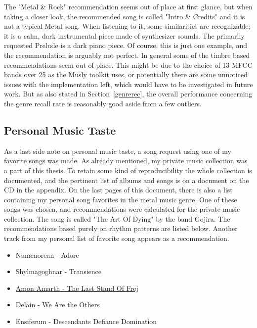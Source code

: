 \noindent The "Metal \& Rock" recommendation seems out of place at first glance, but when taking a closer look, the recommended song is called "Intro \& Credits" and it is not a typical Metal song. When listening to it, some similarities are recognizable; it is a calm, dark instrumental piece made of synthesizer sounds. The primarily requested Prelude is a dark piano piece. Of course, this is just one example, and the recommendation is arguably not perfect. In general some of the timbre based recommendations seem out of place. This might be due to the choice of 13 MFCC bands over 25 as the Musly toolkit uses, or potentially there are some unnoticed issues with the implementation left, which would have to be investigated in future work. But as also stated in Section~\ref{genrerec}, the overall performance concerning the genre recall rate is reasonably good aside from a few outliers.

\subsection{Personal Music Taste}\label{personal}

As a last side note on personal music taste, a song request using one of my favorite songs was made. As already mentioned, my private music collection was a part of this thesis. To retain some kind of reproducibility the whole collection is documented, and the pertinent list of albums and songs is on a document on the CD in the appendix. On the last pages of this document, there is also a list containing my personal song favorites in the metal music genre. One of these songs was chosen, and recommendations were calculated for the private music collection. The song is called "The Art Of Dying" by the band Gojira. The recommendations based purely on rhythm patterns are listed below. Another track from my personal list of favorite song appears as a recommendation. 

\begin{itemize}
	\setlength\itemsep{-0.5em}
	\item Numenorean - Adore
	\item Shylmagoghnar - Transience
	\item \underline{Amon Amarth - The Last Stand Of Frej}
	\item Delain - We Are the Others
	\item Ensiferum - Descendants Defiance Domination
\end{itemize}

